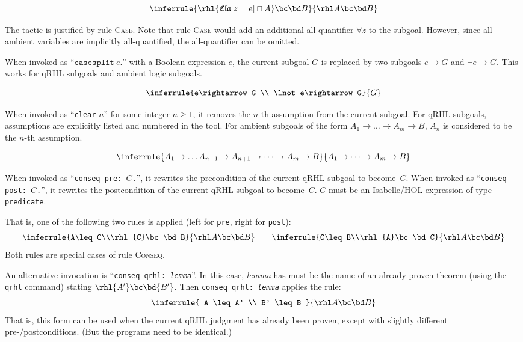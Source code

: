 \documentclass{article}
\renewcommand\ruleref[1]{rule \hbox{\textsc{#1}}}
\begin{document}
\[
\inferrule
{\rhl{\mathfrak{Cla}[z=e]\sqcap A}\bc\bd B}
{\rhl A\bc\bd B}
\]

The tactic is justified by \ruleref{Case}. Note that \ruleref{Case}
would add an additional all-quantifier $\forall z$
to the subgoal. However, since all ambient variables are implicitly
all-quantified, the all-quantifier can be omitted.



When invoked as ``$\mathtt{casesplit}\ e\mathtt{.}$''
with a Boolean expression $e$,
the current subgoal $G$
is replaced by two subgoals $e\rightarrow G$
and $\lnot e\rightarrow G$.
This works for qRHL subgoals and ambient logic subgoals.

\[
  \inferrule
  {e\rightarrow G
    \\
    \lnot e\rightarrow G}
  {G}
\]


When invoked as ``\texttt{clear} $n$''
for some integer $n\geq 1$,
it removes the $n$-th
assumption from the current subgoal. For qRHL subgoals, assumptions
are explicitly listed and numbered in the tool. For ambient subgoals of the form
$A_1\to \dots \to A_m\to B$,
$A_n$ is considered to be the $n$-th assumption.

\[
  \inferrule
  {A_1\to \dots A_{n-1}\to A_{n+1}\to\dots \to A_m\to B}
  {A_1\to \dots \to A_m\to B}
\]




When invoked as ``\texttt{conseq pre: $C$.}'',
it rewrites the precondition of the current qRHL subgoal to become~$C$.
When invoked as ``\texttt{conseq post: $C$.}'',
it rewrites the postcondition of the current qRHL subgoal to become~$C$.
$C$ must be an Isabelle/HOL expression of type \texttt{predicate}.

That is, one of the following two rules is applied (left for
\texttt{pre}, right for \texttt{post}):
\[
  \inferrule{A\leq C\\\rhl{C}\bc\bd B}{\rhl A\bc\bd B}
  \qquad
  \inferrule{C\leq B\\\rhl{A}\bc\bd C}{\rhl A\bc\bd B}
\]
%
Both rules are special cases of \ruleref{Conseq}.

\bigskip

An alternative invocation is ``\texttt{conseq qrhl:\
  \textit{lemma}}''. In this case, \textit{lemma} has must be the name
of an already proven theorem (using the \texttt{qrhl} command) stating
$\rhl{A'}\bc\bd{B'}$. Then \texttt{conseq qrhl:\ \textit{lemma}} applies the rule:
\[
  \inferrule{
    A \leq A' \\
    B' \leq B
  }{
    \rhl A\bc\bd B
  }
\]
That is, this form can be used when the current qRHL judgment has
already been proven, except with slightly different
pre-/postconditions. (But the programs need to be
identical.)
\end{document}
